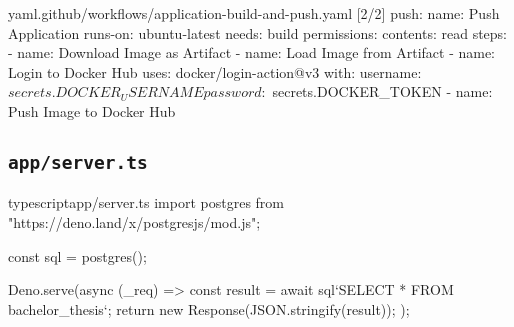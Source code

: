 \begin{codebox}{yaml}{.github/workflows/application-build-and-push.yaml [2/2]}
    push:
    name: Push Application
    runs-on: ubuntu-latest
    needs: build
    permissions:
        contents: read
    steps:
        - name: Download Image as Artifact
        - name: Load Image from Artifact
        - name: Login to Docker Hub
          uses: docker/login-action@v3
          with:
              username: ${{ secrets.DOCKER_USERNAME }}
              password: ${{ secrets.DOCKER_TOKEN }}
        - name: Push Image to Docker Hub  
\end{codebox}

\subsection{\texttt{app/server.ts}}
\label{subsec:BB-01-07_app-X-server-ts}

\begin{codebox}{typescript}{app/server.ts}
import postgres from "https://deno.land/x/postgresjs/mod.js";

const sql = postgres();

Deno.serve(async (_req) => {
    const result = await sql`SELECT * FROM bachelor_thesis`;
    return new Response(JSON.stringify(result));
});    
\end{codebox}
